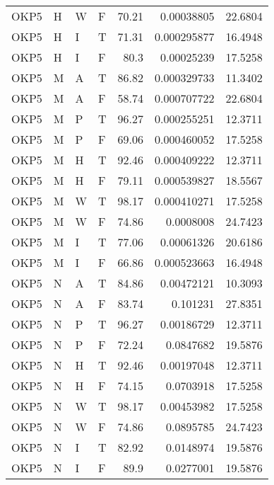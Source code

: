 \begin{table}[htb!]
{\begin{tabular}{llllrrr}
            OKP5     & H     & W     & F          & 70.21      & 0.00038805  & 22.6804  \\
            OKP5     & H     & I     & T          & 71.31      & 0.000295877 & 16.4948  \\
            OKP5     & H     & I     & F          & 80.3       & 0.00025239  & 17.5258  \\
            OKP5     & M     & A     & T          & 86.82      & 0.000329733 & 11.3402  \\
            OKP5     & M     & A     & F          & 58.74      & 0.000707722 & 22.6804  \\
            OKP5     & M     & P     & T          & 96.27      & 0.000255251 & 12.3711  \\
            OKP5     & M     & P     & F          & 69.06      & 0.000460052 & 17.5258  \\
            OKP5     & M     & H     & T          & 92.46      & 0.000409222 & 12.3711  \\
            OKP5     & M     & H     & F          & 79.11      & 0.000539827 & 18.5567  \\
            OKP5     & M     & W     & T          & 98.17      & 0.000410271 & 17.5258  \\
            OKP5     & M     & W     & F          & 74.86      & 0.0008008   & 24.7423  \\
            OKP5     & M     & I     & T          & 77.06      & 0.00061326  & 20.6186  \\
            OKP5     & M     & I     & F          & 66.86      & 0.000523663 & 16.4948  \\
            OKP5     & N     & A     & T          & 84.86      & 0.00472121  & 10.3093  \\
            OKP5     & N     & A     & F          & 83.74      & 0.101231    & 27.8351  \\
            OKP5     & N     & P     & T          & 96.27      & 0.00186729  & 12.3711  \\
            OKP5     & N     & P     & F          & 72.24      & 0.0847682   & 19.5876  \\
            OKP5     & N     & H     & T          & 92.46      & 0.00197048  & 12.3711  \\
            OKP5     & N     & H     & F          & 74.15      & 0.0703918   & 17.5258  \\
            OKP5     & N     & W     & T          & 98.17      & 0.00453982  & 17.5258  \\
            OKP5     & N     & W     & F          & 74.86      & 0.0895785   & 24.7423  \\
            OKP5     & N     & I     & T          & 82.92      & 0.0148974   & 19.5876  \\
            OKP5     & N     & I     & F          & 89.9       & 0.0277001   & 19.5876  \\
            \hline
        \end{tabular}
    }{
    }
\end{table} 
